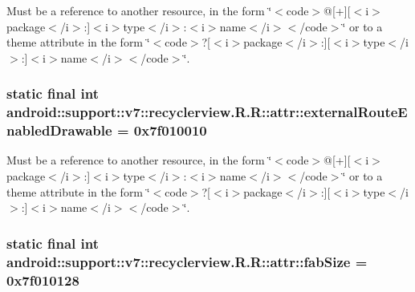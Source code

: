 Must be a reference to another resource, in the form \char`\"{}$<$code$>$@\mbox{[}+\mbox{]}\mbox{[}$<$i$>$package$<$/i$>$:\mbox{]}$<$i$>$type$<$/i$>$:$<$i$>$name$<$/i$>$$<$/code$>$\char`\"{} or to a theme attribute in the form \char`\"{}$<$code$>$?\mbox{[}$<$i$>$package$<$/i$>$:\mbox{]}\mbox{[}$<$i$>$type$<$/i$>$:\mbox{]}$<$i$>$name$<$/i$>$$<$/code$>$\char`\"{}. \hypertarget{classandroid_1_1support_1_1v7_1_1recyclerview_1_1_r_1_1attr_d5ad51e05d1b0c6aa75b0d37963b0b19}{
\subsubsection[{externalRouteEnabledDrawable}]{\setlength{\rightskip}{0pt plus 5cm}static final int android::support::v7::recyclerview.R.R::attr::externalRouteEnabledDrawable = 0x7f010010}}
\label{classandroid_1_1support_1_1v7_1_1recyclerview_1_1_r_1_1attr_d5ad51e05d1b0c6aa75b0d37963b0b19}


Must be a reference to another resource, in the form \char`\"{}$<$code$>$@\mbox{[}+\mbox{]}\mbox{[}$<$i$>$package$<$/i$>$:\mbox{]}$<$i$>$type$<$/i$>$:$<$i$>$name$<$/i$>$$<$/code$>$\char`\"{} or to a theme attribute in the form \char`\"{}$<$code$>$?\mbox{[}$<$i$>$package$<$/i$>$:\mbox{]}\mbox{[}$<$i$>$type$<$/i$>$:\mbox{]}$<$i$>$name$<$/i$>$$<$/code$>$\char`\"{}. \hypertarget{classandroid_1_1support_1_1v7_1_1recyclerview_1_1_r_1_1attr_03e54dd11972cd2363eba34bb4d8d594}{
\subsubsection[{fabSize}]{\setlength{\rightskip}{0pt plus 5cm}static final int android::support::v7::recyclerview.R.R::attr::fabSize = 0x7f010128}}
\label{classandroid_1_1support_1_1v7_1_1recyclerview_1_1_r_1_1attr_03e54dd11972cd2363eba34bb4d8d594}


